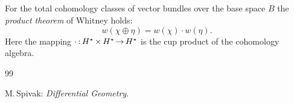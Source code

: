 \documentclass[11pt,twoside]{article}
\begin{document}
\subparagraph{}
For the total cohomology classes of vector bundles over the base space $B$
the \textit{product theorem} of Whitney holds:
\[
w(\chi \oplus \eta) = w(\chi) \cdot w(\eta).
\]
Here the mapping $\cdot {\,:\,} H^{\star} {\,\times\,} H^{\star} {\,\to\,} H^{\star}$
is the cup product of the cohomology algebra.

\newpage
\thispagestyle{empty}

\vspace{8mm}
\begin{thebibliography}{99}

 M.\,Spivak:
\textit{Differential Geometry}.
\end{thebibliography}

\end{document}
